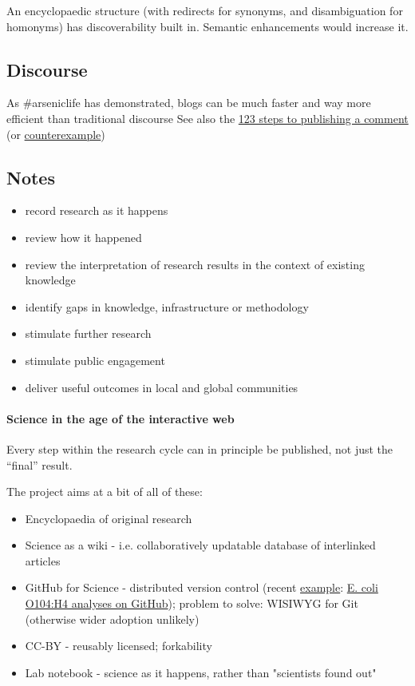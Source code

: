 \documentclass[final,authoryear,3p]{elsarticle-open-drafting}
\begin{document}
An encyclopaedic structure (with redirects for synonyms, and disambiguation for homonyms) has discoverability built in. Semantic enhancements would increase it.

\subsection{Discourse}
As \#arseniclife has demonstrated, blogs can be much faster and way more efficient than traditional discourse
See also the \href{http://scienceblogs.com/catdynamics/2009/08/how_to_publish_a_scientific_co.php}{123 steps to publishing a comment} (or \href{http://slawekk.wordpress.com/2010/05/21/how-to-publish-counterexamples-in-1-2-3-easy-steps/}{counterexample})

\subsection{Notes}

\begin{itemize}
	\item record research as it happens
	\item review how it happened
	\item review the interpretation of research results in the context of existing knowledge
	\item identify gaps in knowledge, infrastructure or methodology
	\item stimulate further research
	\item stimulate public engagement
	\item deliver useful outcomes in local and global communities
\end{itemize}

\paragraph{Science in the age of the interactive web}

Every step within the research cycle can in principle be published, not just the ``final'' result.

The project aims at a bit of all of these:
\begin{itemize}
	\item Encyclopaedia of original research
	\item Science as a wiki - i.e. collaboratively updatable database of interlinked articles
	\item GitHub for Science - distributed version control (recent \href{http://bacpathgenomics.wordpress.com/2011/06/13/e-coli-data-released-under-creative-commons-0-license/}{example}: \href{https://github.com/ehec-outbreak-crowdsourced/BGI-data-analysis/wiki}{E. coli O104:H4 analyses on GitHub}); problem to solve: WISIWYG for Git (otherwise wider adoption unlikely)
	\item CC-BY - reusably licensed; forkability
	\item Lab notebook - science as it happens, rather than "scientists found out"
\end{itemize}
\end{document}
